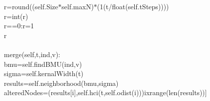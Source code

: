 {{\begin{tabbing}
\hspace{48pt}r\hspace{6pt}=\hspace{6pt}round((self.Size$\ast$self.maxN)\hspace{6pt}$\ast$\hspace{6pt}(1\hspace{6pt}\dash{}\hspace{6pt}(t/float(self.tSteps))))\\
\hspace{48pt}r\hspace{6pt}=\hspace{6pt}int(r)\\
\hspace{6pt}r\hspace{6pt}==\hspace{6pt}0:\hspace{6pt}r\hspace{6pt}=\hspace{6pt}1\\
\hspace{6pt}r\\
\\
\hspace{6pt}merge(self,t,ind,v):\\
\hspace{48pt}bmu\hspace{6pt}=\hspace{6pt}self.findBMU(ind,v)\\
\hspace{48pt}sigma\hspace{6pt}=\hspace{6pt}self.kernalWidth(t)\\
\hspace{48pt}results\hspace{6pt}=\hspace{6pt}self.neighborhood(\hspace{6pt}bmu\hspace{6pt},\hspace{6pt}sigma\hspace{6pt})\\
\hspace{48pt}alteredNodes\hspace{6pt}=\hspace{6pt}{[}(results{[}i{]},self.hci(t,self.odist(i)))\hspace{6pt}i\hspace{6pt}xrange(len(results)){]}\\

\end{tabbing}}}
